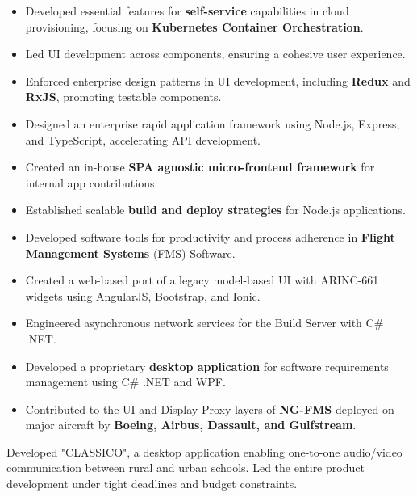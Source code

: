 \documentclass[10pt,a4paper,ragged2e,withhyper]{altacv}
\begin{document}
\begin{paracol}{2}
\begin{itemize}
  \item Developed essential features for \textbf{self-service} capabilities in cloud provisioning, focusing on \textbf{Kubernetes Container Orchestration}.
  \item Led UI development across components, ensuring a cohesive user experience.
  \item Enforced enterprise design patterns in UI development, including \textbf{Redux} and \textbf{RxJS}, promoting testable components.
  \item Designed an enterprise rapid application framework using Node.js, Express, and TypeScript, accelerating API development.
  \item Created an in-house \textbf{SPA agnostic micro-frontend framework} for internal app contributions.
  \item Established scalable \textbf{build and deploy strategies} for Node.js applications.
\end{itemize}

\divider

\begin{itemize}
  \item Developed software tools for productivity and process adherence in \textbf{Flight Management Systems} (FMS) Software.
  \item Created a web-based port of a legacy model-based UI with ARINC-661 widgets using AngularJS, Bootstrap, and Ionic.
  \item Engineered asynchronous network services for the Build Server with C\# .NET.
  \item Developed a proprietary \textbf{desktop application} for software requirements management using C\# .NET and WPF.
  \item Contributed to the UI and Display Proxy layers of \textbf{NG-FMS} deployed on major aircraft by \textbf{Boeing, Airbus, Dassault, and Gulfstream}.
\end{itemize}


\divider

Developed "CLASSICO", a desktop application enabling one-to-one audio/video communication between rural and urban schools. Led the entire product development under tight deadlines and budget constraints.


\end{paracol}
\end{document}
